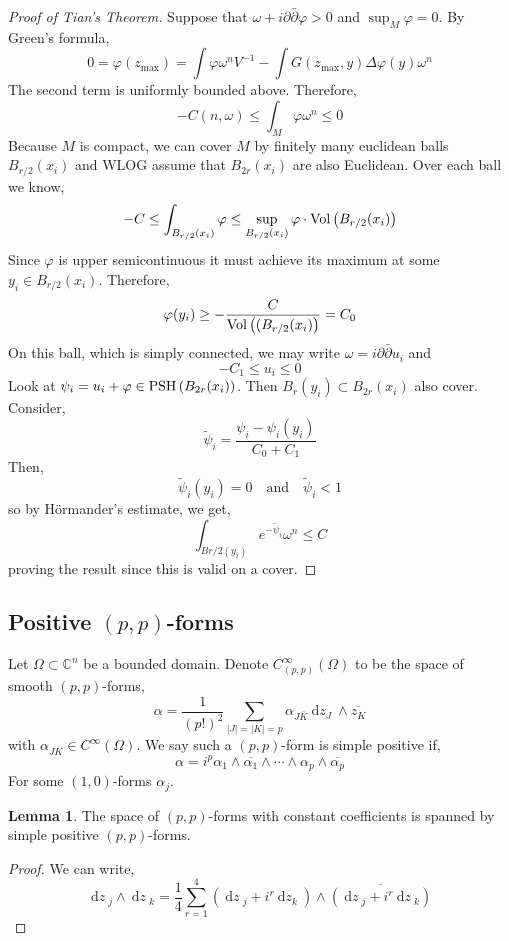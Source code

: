 \documentclass[12pt]{extarticle}
\newcommand{\C}{\mathbb{C}}
\renewcommand{\d}[1]{\: \mathrm{d}#1 \:}
\theoremstyle{definition}
\newtheorem{lemma}[theorem]{Lemma}
\begin{document}
\begin{proof}[Proof of Tian's Theorem]
Suppose that $\omega + i \partial \bar{\partial} \varphi > 0$ and $\sup_M \varphi = 0$. By Green's formula,
\[ 0 = \varphi(z_{\text{max}}) = \int \varphi \omega^n V^{-1} - \int G(z_{\text{max}}, y) \Delta \varphi(y) \omega^n \]
The second term is uniformly bounded above. Therefore,
\[ -C(n, \omega) \le \int_M \varphi \omega^n \le 0 \]
Because $M$ is compact, we can cover $M$ by finitely many euclidean balls $B_{r/2}(x_i)$ and WLOG assume that $B_{2r}(x_i)$ are also Euclidean. Over each ball we know,
\[ - C \le \int_{B_{r/2}(x_i)} \varphi \le \sup_{B_{r/2}(x_i)} \varphi \cdot \mathrm{Vol}\left(B_{r/2}(x_i)\right) \]
Since $\varphi$ is upper semicontinuous it must achieve its maximum at some $y_i \in B_{r/2}(x_i)$. Therefore,
\[ \varphi(y_i) \ge - \frac{C}{\mathrm{Vol}\left((B_{r/2}(x_i)\right)} = C_0 \]
On this ball, which is simply connected, we may write $\omega = i \partial \bar{\partial} u_i$ and 
\[ -C_1 \le u_i \le 0 \]
Look at $\psi_i = u_i + \varphi \in \mathrm{PSH}\left( B_{2r}(x_i) \right)$. Then $B_{r}(y_i) \subset B_{2r}(x_i)$ also cover. Consider,
\[ \tilde{\psi}_i = \frac{\psi_i - \psi_i(y_i)}{C_0 + C_1} \] 
Then,
\[ \tilde{\psi}_i(y_i) = 0 \quad \text{and} \quad \tilde{\psi}_i < 1 \]
so by H\"{o}rmander's estimate, we get,
\[ \int_{B{r/2}(y_i)} e^{-\tilde{\psi}_i} \omega^n \le C \]
proving the result since this is valid on a cover.
\end{proof}

\subsection{Positive $(p,p)$-forms}

Let $\Omega \subset \C^n$ be a bounded domain. Denote $C^\infty_{(p,p)}(\Omega)$ to be the space of smooth $(p,p)$-forms,
\[ \alpha = \frac{1}{(p!)^2} \sum_{|J| = |K| = p} \alpha_{J \bar{K}} \d{z_{J}} \wedge \overline{z_K} \]
with $\alpha_{J \bar{K}} \in C^\infty(\Omega)$. We say such a $(p,p)$-form is simple positive if,
\[ \alpha = i^p \alpha_1 \wedge \overline{\alpha_1} \wedge \cdots \wedge \alpha_p \wedge \overline{\alpha_p} \]
For some $(1,0)$-forms $\alpha_j$. 

\begin{lemma}
The space of $(p, p)$-forms with constant coefficients is spanned by simple positive $(p, p)$-forms.  
\end{lemma}

\begin{proof}
We can write,
\[ \d{z}_j \wedge \d{z}_k = \frac{1}{4} \sum_{r = 1}^4 \left(\d{z}_j + i^r \d{z_k} \right) \wedge \overline{\left( \d{z}_j + i^r \d{z}_k \right)}  \]
\end{proof}
\end{document}
